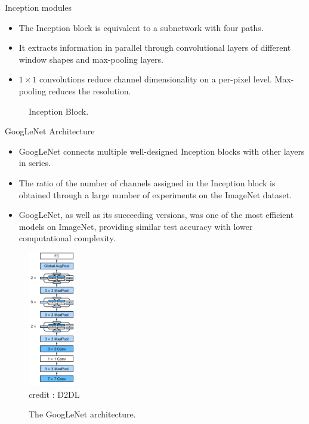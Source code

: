 \begin{vbframe}{Inception modules}
    \begin{itemize}
        \item The Inception block is equivalent to a subnetwork with four paths. 
        \item It extracts information in parallel through convolutional layers of different window shapes and max-pooling layers.  
        \item $1 \times 1$ convolutions reduce channel dimensionality on a per-pixel level. Max-pooling reduces the resolution.
    \end{itemize}
  \begin{figure}
    \centering
    \caption{Inception Block.}
  \end{figure}
        \end{vbframe}


\begin{vbframe}{GoogLeNet Architecture}
    \begin{itemize}
        \item GoogLeNet connects multiple well-designed Inception blocks with other layers in series. 
        \item The ratio of the number of channels assigned in the Inception block is obtained through a large number of experiments on the ImageNet dataset.
        \item GoogLeNet, as well as its succeeding versions, was one of the most efficient models on ImageNet, providing similar test accuracy with lower computational complexity.
    \end{itemize}
    \framebreak
    
  \begin{figure}
  \centering
    \includegraphics[width=2cm]{plots/moderncnn/inception-full.png}
    \tiny{\\ credit : D2DL}
    \caption{The GoogLeNet architecture.}
  \end{figure}
    
\end{vbframe}

